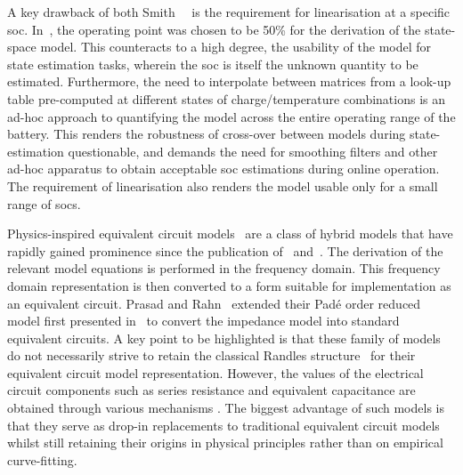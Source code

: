 
A key  drawback of  both Smith~\etal{}~\cite{Smith2007}  is the  requirement for
linearisation at a specific  \gls{soc}. In~\cite{Smith2007}, the operating point
was  chosen  to be  50\%  for  the derivation  of  the  state-space model.  This
counteracts to  a high degree, the  usability of the model  for state estimation
tasks, wherein  the \gls{soc} is  itself the  unknown quantity to  be estimated.
Furthermore,  the need  to interpolate  between  matrices from  a look-up  table
pre-computed at different states of charge/temperature combinations is an ad-hoc
approach  to quantifying  the model  across the  entire operating  range of  the
battery.  This  renders  the  robustness of  cross-over  between  models  during
state-estimation questionable,  and demands the  need for smoothing  filters and
other ad-hoc apparatus to obtain  acceptable \gls{soc} estimations during online
operation. The requirement  of linearisation also renders the  model usable only
for a small range of \gls{soc}s.

Physics-inspired equivalent circuit models~\cite{Merla2018,Prasad2014,Zhang2017}
are  a  class  of  hybrid  models that  have  rapidly  gained  prominence  since
the publication  of~\cite{Jokar2016} and~\cite{Fan2015}.  The derivation  of the
relevant model  equations is performed  in the frequency domain.  This frequency
domain representation  is then converted  to a form suitable  for implementation
as  an  equivalent circuit.  Prasad  and  Rahn~\cite{Prasad2014} extended  their
Padé order  reduced model first  presented in~\cite{Prasad2013} to  convert the
impedance model into standard equivalent circuits. A key point to be highlighted
is that these family of models do not necessarily strive to retain the classical
Randles   structure~\cite{Randles1947}  for   their  equivalent   circuit  model
representation. However, the values of the electrical circuit components such as
series  resistance  and  equivalent  capacitance are  obtained  through  various
mechanisms . The biggest advantage of
such models is that they serve as drop-in replacements to traditional equivalent
circuit  models whilst  still  retaining their  origins  in physical  principles
rather   than   on   empirical   curve-fitting.

